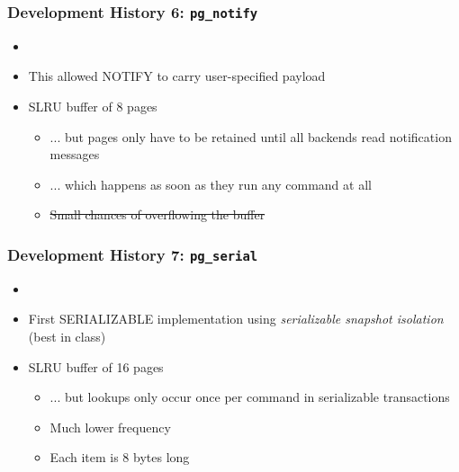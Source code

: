 \begin{frame}
  \frametitle{Development History 6: \texttt{pg\_notify}}
  \begin{itemize}
    \item {}
    \item This allowed NOTIFY to carry user-specified payload
    \item SLRU buffer of 8 pages
      \begin{itemize}
	\item ... but pages only have to be retained until all backends read notification messages
	\item ... which happens as soon as they run any command at all
	\item \sout{Small chances of overflowing the buffer}
      \end{itemize}
  \end{itemize}
\end{frame}

\begin{frame}
  \frametitle{Development History 7: \texttt{pg\_serial}}
   \begin{itemize}
     \item {}
     \item First SERIALIZABLE implementation using \emph{serializable snapshot isolation} (best in class)
     \item SLRU buffer of 16 pages
       \begin{itemize}
	 \item ... but lookups only occur once per command in serializable transactions
	 \item Much lower frequency
	 \item Each item is 8 bytes long
       \end{itemize}
   \end{itemize}
\end{frame}

